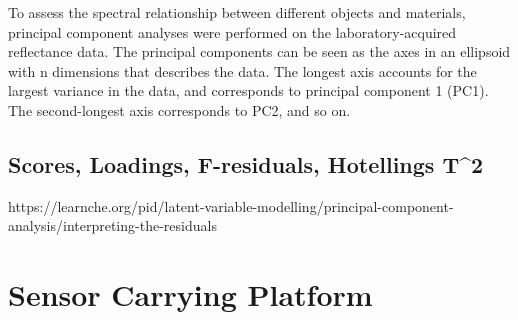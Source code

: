 \begin{figure}[H]
  \begin{minipage}{\wd\FigBox}
    \centering\usebox{\FigBox}
  \end{minipage}\hspace*{\FigHSkip}
  \label{head}
\end{figure}



To assess the spectral relationship between different objects and materials, principal component analyses were performed on the laboratory-acquired reflectance data. The principal components can be seen as the axes in an ellipsoid with n dimensions that describes the data. The longest axis accounts for the largest variance in the data, and corresponds to principal component 1 (PC1). The second-longest axis corresponds to PC2, and so on.

\subsection{Scores, Loadings, F-residuals, Hotellings T^2 }
https://learnche.org/pid/latent-variable-modelling/principal-component-analysis/interpreting-the-residuals

\vspace{1.3cm}
\section{Sensor Carrying Platform}

